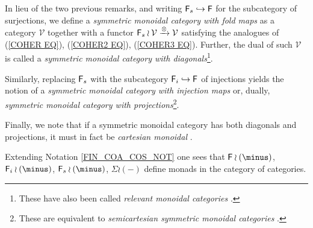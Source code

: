 \documentclass[a4paper,10pt]{article}%
\begin{document}


\begin{remark}\label{FINSURJ REM}
	In lieu of the two previous remarks,
	and writing $\mathsf{F}_s \hookrightarrow \mathsf{F}$ 
	for the subcategory of surjections,
	we define a 
	\textit{symmetric monoidal category with fold maps}
	as a category $\mathcal{V}$ together with a functor
	$\mathsf{F}_s \wr \mathcal{V} \xrightarrow{\otimes} \mathcal{V}$
	satisfying the analogues of  
	(\ref{COHER EQ}), (\ref{COHER2 EQ}), (\ref{COHER3 EQ}).
	Further, the dual of such $\mathcal{V}$ is called a 
	\textit{symmetric monoidal category with diagonals}\footnote{
	These have also been called \textit{relevant monoidal categories} \cite{DP07}.}.
	
	Similarly, replacing $\mathsf{F}_s$ with the subcategory
$\mathsf{F}_i \hookrightarrow \mathsf{F}$ of injections yields the notion of a \textit{symmetric monoidal category with injection maps} or, dually, \textit{symmetric monoidal category with projections}\footnote{
These are equivalent to \textit{semicartesian symmetric monoidal categories} \cite{Lei16}.}.

Finally, we note that if a symmetric monoidal category has both diagonals and projections, it must in fact be \textit{cartesian monoidal} \cite[IV.2]{EK66}.
\end{remark}


\begin{remark}
	Extending Notation \ref{FIN_COA_COS_NOT} one sees that 
	$\Fin \wr (\minus)$, 
	$\Fin_i \wr (\minus)$,
	$\Fin_s \wr (\minus)$,
	$\Sigma \wr (\minus)$
define monads in the category of categories.
%	
\end{remark}
\end{document}
